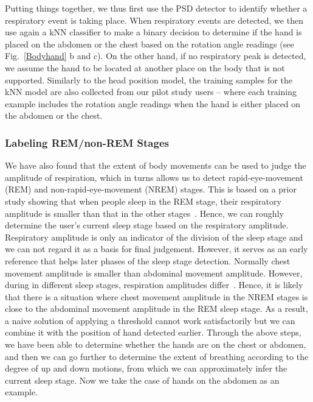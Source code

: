{Putting things together, we thus first use the PSD detector to identify whether a respiratory event is taking place. When respiratory events are detected, we }then use again a kNN classifier to make a binary decision to determine if the hand is placed on the abdomen or the chest based on the rotation angle readings (see Fig.~\ref{Bodyhand} b and c). {On the other hand, if no respiratory peak is detected, we assume the hand to be located at another place on the body that is not supported. } Similarly to the head position model, the training samples for the kNN model are also collected from our pilot study users -- where each training example includes the rotation angle readings when the hand is either placed on the abdomen or the chest.

\subsubsection{Labeling REM/non-REM Stages}

We have also found that the extent of body movements can be used to judge the amplitude of respiration, which in turns allows us to detect rapid-eye-movement (REM) and non-rapid-eye-movement (NREM) stages. This is based on a prior study showing that when people sleep in the REM stage, their respiratory amplitude is smaller than that in the other stages~\cite{respiratory1982}. Hence, we can roughly determine the user's current sleep stage based on the respiratory amplitude. Respiratory amplitude is only an indicator of the division of the sleep stage and we can not regard it as a basis for final judgement.  {However, it serves as an early reference that helps later phases of the sleep stage detection. Normally chest movement amplitude is smaller than abdominal movement amplitude. However, during in different sleep stages, respiration amplitudes differ~\cite{respiratory}. Hence, it is likely that there is a situation where chest movement amplitude in the NREM stages is close to the abdominal movement amplitude in the REM sleep stage. As a result, a naive solution of applying a threshold cannot work satisfactorily but we can combine it with the position of hand detected earlier. Through the above steps, we have been able to determine whether the hands are on the chest or abdomen, and then we can go further to determine the extent of breathing according to the degree of up and down motions, from which we can approximately infer the current sleep stage}. Now we take the case of hands on the abdomen as an example.

